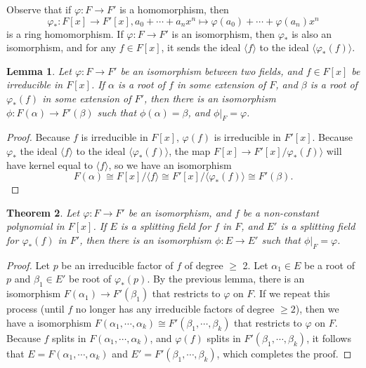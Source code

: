 \documentclass[12pt]{report}
\newtheorem{theorem}{Theorem}[section]
\newtheorem{lemma}[theorem]{Lemma}
\theoremstyle{definition}
\begin{document}
Observe that if $\varphi : F \to F'$ is a homomorphism, then
$$\varphi_*:F[x]\to F'[x], a_0+\cdots+a_nx^n\mapsto \varphi(a_0)+\cdots+\varphi(a_n)x^n $$
is a ring homomorphism. If $\varphi : F \to F'$ is an isomorphism, then $\varphi_*$ is also an isomorphism, and for any $f \in F[x]$, it sends the ideal $\langle f\rangle$ to the ideal $\langle \varphi_*(f)\rangle$.

\begin{lemma}\label{splitlemma1}
	Let $\varphi : F \to F'$ be an isomorphism between two fields, and $f \in F[x]$ be irreducible in $F[x]$. If $\alpha$ is a root of $f$ in some extension of $F$, and $\beta$ is a root of $\varphi_*(f)$ in some extension of $F'$, then there is an isomorphism $\phi : F(\alpha) \to F'(\beta)$ such that $\phi(\alpha) = \beta$, and $\phi|_F= \varphi$.
\end{lemma}

\begin{proof}
	Because $f$ is irreducible in $F[x]$, $\varphi(f)$ is irreducible in $F'[x]$. Because $\varphi_*$ the ideal $\langle f\rangle$ to the ideal $\langle \varphi_*(f)\rangle$, the map $F[x] \to F'[x]/\varphi_*(f)\rangle$ will have kernel equal to $\langle f\rangle$, so we have an isomorphism $$F(\alpha)\cong F[x]/\langle f\rangle \cong F'[x]/\langle \varphi_*(f)\rangle \cong F'(\beta).$$
\end{proof}

\begin{theorem}
	Let $\varphi: F \to F'$ be an isomorphism, and $f$ be a non-constant polynomial in $F[x]$. If $E$ is a splitting field for $f$ in $F$, and $E'$ is a splitting field for $\varphi_*(f)$ in $F'$, then there is an isomorphism $\phi : E \to E'$ such that $\phi|_F= \varphi$.
\end{theorem}

\begin{proof}
	Let $p$ be an irreducible factor of $f$ of degree $\geq$ 2. Let $\alpha_1 \in E$ be a root of $p$ and $\beta_1 \in E'$ be root of $\varphi_*(p)$. By the previous lemma, there is an isomorphism $F(\alpha_1) \to F'(\beta_1)$ that restricts to $\varphi$ on $F$. If we repeat this process (until $f$ no longer has any irreducible factors of degree $\geq 2$), then we have a isomorphism $F(\alpha_1,\cdots, \alpha_k) \cong F'(\beta_1,\cdots, \beta_k)$ that restricts to $\varphi$ on $F$. Because $f$ splits in $F(\alpha_1,\cdots, \alpha_k)$, and $\varphi(f)$ splits in $F'(\beta_1,\cdots, \beta_k)$, it follows that $E = F(\alpha_1,\cdots, \alpha_k)$ and $E' = F'(\beta_1,\cdots, \beta_k)$, which completes the proof.
\end{proof}
\end{document}
